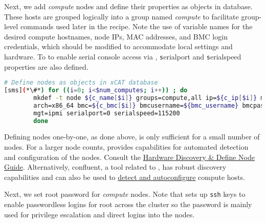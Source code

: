 
\noindent Next, we add {\em compute} nodes and define their properties as
objects in \xCAT{} database. 
These hosts are grouped logically into a group named {\em
compute} to facilitate group-level commands used later in the recipe.  Note the
use of variable names for the desired compute hostnames, node IPs, MAC
addresses, and BMC login credentials, which should be modified to accommodate
local settings and hardware. To to enable serial console access via  \xCAT{}, 
{\texttt serialport} and {\texttt serialspeed}
properties are also defined.

\begin{lstlisting}[language=bash,keywords={},upquote=true,basicstyle=\footnotesize\ttfamily,]
# Define nodes as objects in xCAT database
[sms](*\#*) for ((i=0; i<$num_computes; i++)) ; do
		mkdef -t node ${c_name[$i]} groups=compute,all ip=${c_ip[$i]} mac=${c_mac[$i]} netboot=xnba \
		arch=x86_64 bmc=${c_bmc[$i]} bmcusername=${bmc_username} bmcpassword=${bmc_password} \
		mgt=ipmi serialport=0 serialspeed=115200 
        done
\end{lstlisting}

\begin{center}
  \begin{tcolorbox}[]
    \small 
Defining nodes one-by-one, as done above, is only sufficient
for a small number of nodes. For a larger node counts,
\xCAT{} provides capabilities for automated detection and
configuration of the nodes.
Consult the
\href{http://xcat-docs.readthedocs.io/en/stable/guides/admin-guides/manage_clusters/ppc64le/discovery/}{\color{blue}\xCAT{}
Hardware Discovery \& Define Node Guide}. Alternatively, confluent, a tool
related to \xCAT{}, has robust discovery capabilities and can also be used to
\href{https://hpc.lenovo.com/users/documentation/confluentdisco.html}{\color{blue}detect
and autoconfigure} compute hosts.  
\end{tcolorbox}
\end{center}


Next, we set root password for {\em compute} nodes. Note that \xCAT{} sets up 
\texttt{ssh} keys to enable passwordless logins for root across the cluster 
so the password is mainly used for privilege escalation and direct logins into
the nodes.

